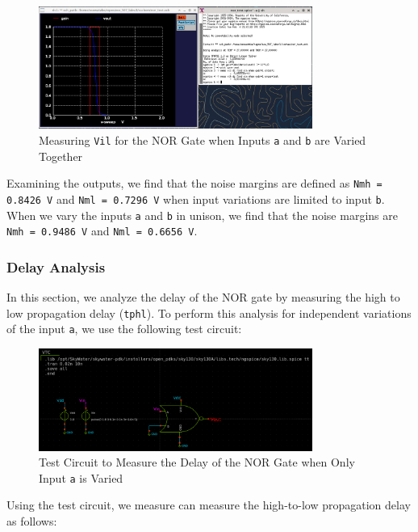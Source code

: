 \documentclass[fleqn]{article}
\begin{document}
	\begin{figure}[H]
		\centerline{\includegraphics[width=0.8\textwidth]{nor_noise_analysis_sweep_va_vb.png}}
		\caption{Measuring \texttt{Vil} for the NOR Gate when Inputs \texttt{a} and \texttt{b} are Varied Together}
		\label{fig::nor_noise_analysis_sweep_va_vb}
	\end{figure}
	
	Examining the outputs, we find that the noise margins are defined as \texttt{Nmh = 0.8426 V} and \texttt{Nml = 0.7296 V} when input variations are limited to input \texttt{b}. When we vary the inputs \texttt{a} and \texttt{b} in unison, we find that the noise margins are \texttt{Nmh = 0.9486 V} and \texttt{Nml = 0.6656 V}.
	
	\subsubsection{Delay Analysis}
	
	In this section, we analyze the delay of the NOR gate by measuring the high to low propagation delay (\texttt{tphl}). To perform this analysis for independent variations of the input \texttt{a}, we use the following test circuit:
	
	\begin{figure}[H]
		\centerline{\includegraphics[width=0.8\textwidth]{nor_delay_test_sweep_va.png}}
		\caption{Test Circuit to Measure the Delay of the NOR Gate when Only Input \texttt{a} is Varied}
		\label{fig::nor_delay_test_sweep_va}
	\end{figure}
	
	Using the test circuit, we measure can measure the high-to-low propagation delay as follows:
	
\end{document}

